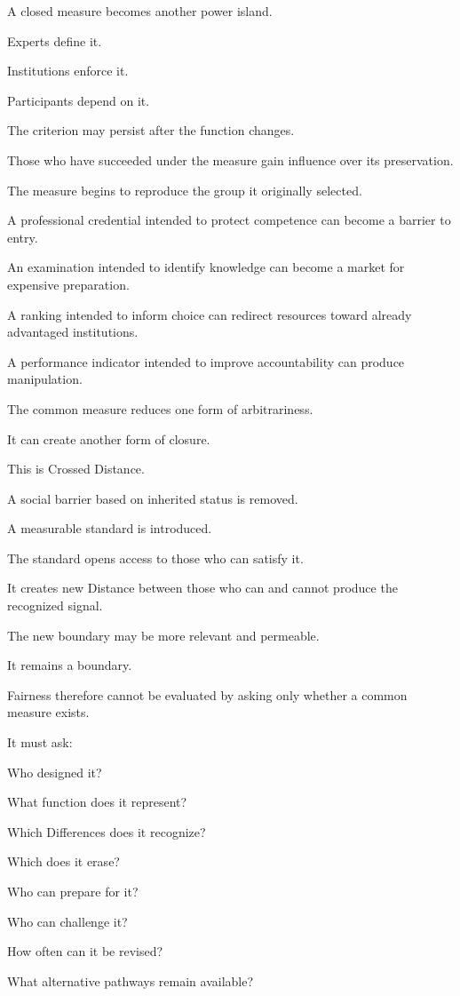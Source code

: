 A closed measure becomes another power island.

Experts define it.

Institutions enforce it.

Participants depend on it.

The criterion may persist after the function changes.

Those who have succeeded under the measure gain influence over its preservation.

The measure begins to reproduce the group it originally selected.

A professional credential intended to protect competence can become a barrier to entry.

An examination intended to identify knowledge can become a market for expensive preparation.

A ranking intended to inform choice can redirect resources toward already advantaged institutions.

A performance indicator intended to improve accountability can produce manipulation.

The common measure reduces one form of arbitrariness.

It can create another form of closure.

This is Crossed Distance.

A social barrier based on inherited status is removed.

A measurable standard is introduced.

The standard opens access to those who can satisfy it.

It creates new Distance between those who can and cannot produce the recognized signal.

The new boundary may be more relevant and permeable.

It remains a boundary.

Fairness therefore cannot be evaluated by asking only whether a common measure exists.

It must ask:

Who designed it?

What function does it represent?

Which Differences does it recognize?

Which does it erase?

Who can prepare for it?

Who can challenge it?

How often can it be revised?

What alternative pathways remain available?

